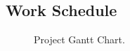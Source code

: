 \documentclass[12pt]{article}
\begin{document}
    \subsection{Work Schedule}
    \begin{figure}[H]
    	\centering
    	\setlength{\fboxsep}{0pt}
    	\caption{Project Gantt Chart.}
    	\label{fig:project_plan}
    \end{figure}

	\pagebreak
	\printbibliography

\end{document}
